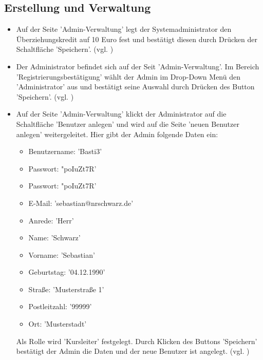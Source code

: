 \documentclass[a4paper]{scrreprt}
\begin{document}
		\subsection{Erstellung und Verwaltung}
			\begin{itemize}
				\item {} 
				 Auf der Seite 'Admin-Verwaltung' legt der Systemadministrator den Überziehungskredit auf 10 Euro fest und bestätigt diesen durch Drücken der Schaltfläche 'Speichern'. (vgl. )
				
				\item {}
				 Der Administrator befindet sich auf der Seit 'Admin-Verwaltung'. Im Bereich 'Registrierungsbestätigung' wählt der Admin im Drop-Down Menü den 'Administrator' aus und bestätigt seine Auswahl durch Drücken des Button 'Speichern'. (vgl. )
				
				\item {} 
				 Auf der Seite 'Admin-Verwaltung' klickt der Administrator auf die Schaltfläche 'Benutzer anlegen' und wird auf die Seite 'neuen Benutzer anlegen' weitergeleitet. Hier gibt der Admin folgende Daten ein:
					\begin{itemize}
						\item Benutzername: 'Basti3' 
						\item Passwort: "poIuZt7R'
						\item Passwort: "poIuZt7R'
						\item E-Mail: 'sebastian@nrschwarz.de'
						\item Anrede: 'Herr'
						\item Name: 'Schwarz'
						\item Vorname: 'Sebastian'
						\item Geburtstag: '04.12.1990'
						\item Straße: 'Musterstraße 1'
						\item Postleitzahl: '99999'
						\item Ort: 'Musterstadt'
					\end{itemize}
				 Als Rolle wird 'Kursleiter' festgelegt. Durch Klicken des Buttons 'Speichern' bestätigt der Admin die Daten und der neue Benutzer ist angelegt.	(vgl. )
				

\end{itemize}
\end{document}
